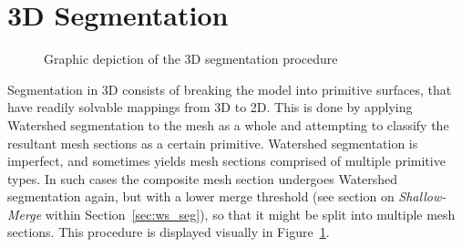 \section{3D Segmentation}
\begin{figure}[H]
	\centering
{}
	\caption{Graphic depiction of the 3D segmentation procedure}
	\label{fig:Seg3D}
\end{figure}
Segmentation in 3D consists of breaking the model into primitive surfaces, that have readily solvable mappings from 3D to 2D.
This is done by applying Watershed segmentation to the mesh as a whole and attempting to classify the resultant mesh sections as a certain primitive.
Watershed segmentation is imperfect, and sometimes yields mesh sections comprised of multiple primitive types.
In such cases the composite mesh section undergoes Watershed segmentation again, but with a lower merge threshold (see section on \textit{Shallow-Merge} within Section~\ref{sec:ws_seg}), so that it might be split into multiple mesh sections.
This procedure is displayed visually in Figure~\ref{fig:Seg3D}.

